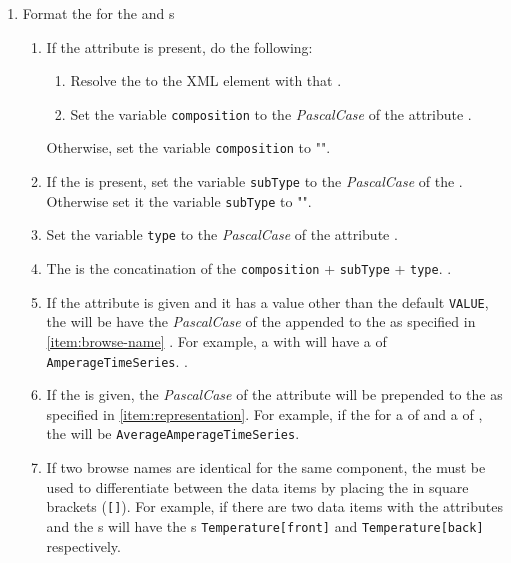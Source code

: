 \begin{enumerate}
  \item Format the  for the  and  s
  \begin{enumerate}[after=\vspace{\baselineskip}]
    \setlength\itemsep{1em}
    \item If the  attribute  is present, do the following:
    \begin{enumerate}
      \item Resolve the  to the  XML element with that .
      \item Set the variable \texttt{composition} to the \textit{PascalCase} of the  attribute .
    \end{enumerate}
    Otherwise, set the variable \texttt{composition} to "".
    \item If the  is present, set the variable \texttt{subType} to the \textit{PascalCase} of the . Otherwise set it the variable \texttt{subType} to "".
    \item Set the variable \texttt{type} to the \textit{PascalCase} of the  attribute .
    \item The  is the concatination of the \texttt{composition} + \texttt{subType} + \texttt{type}. \label{item:browse-name}.
    \item If the  attribute is given and it has a value other than the default \texttt{VALUE}, the  will be have the \textit{PascalCase} of the  appended to the   as specified in \ref{item:browse-name} . For example, a  with  will have a  of \texttt{AmperageTimeSeries}. \label{item:representation}.
    \item If the  is given, the \textit{PascalCase} of the  attribute will be prepended to the   as specified in \ref{item:representation}. For example, if the  for a  of  and a  of , the  will be  \texttt{AverageAmperageTimeSeries}. \label{item:statistic}
    \item If two browse names are identical for the same component, the  must be used to differentiate between the data items by placing the  in square brackets (\texttt{[]}). For example, if there are two  data items with the attributes  and  the s will have the s \texttt{Temperature[front]} and \texttt{Temperature[back]} respectively. \label{item:data-item-name}
  \end{enumerate} 


\end{enumerate}
